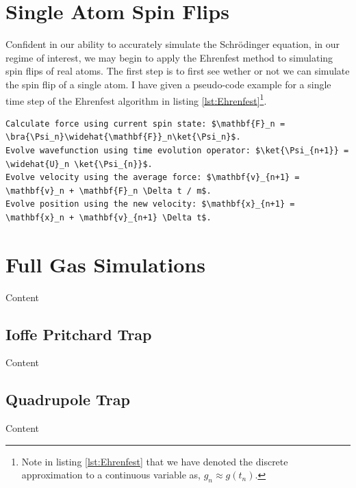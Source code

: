 
\section{Single Atom Spin Flips}

Confident in our ability to accurately simulate the Schr\"odinger equation, in our regime of interest, we may begin to apply the Ehrenfest method to simulating spin flips of real atoms.
The first step is to first see wether or not we can simulate the spin flip of a single atom.
I have given a pseudo-code example for a single time step of the Ehrenfest algorithm in listing \ref{lst:Ehrenfest}\footnote{Note in listing \ref{lst:Ehrenfest} that we have denoted the discrete approximation to a continuous variable as, $g_n \approx g(t_n)$.}.
\begin{lstlisting}[float,caption=Psuedo-code algorithm for a single Ehrenfest method time step, mathescape,label= lst:Ehrenfest,stepnumber=1]
Calculate force using current spin state: $\mathbf{F}_n = \bra{\Psi_n}\widehat{\mathbf{F}}_n\ket{\Psi_n}$.
Evolve wavefunction using time evolution operator: $\ket{\Psi_{n+1}} = \widehat{U}_n \ket{\Psi_{n}}$.
Evolve velocity using the average force: $\mathbf{v}_{n+1} = \mathbf{v}_n + \mathbf{F}_n \Delta t / m$.
Evolve position using the new velocity: $\mathbf{x}_{n+1} = \mathbf{x}_n + \mathbf{v}_{n+1} \Delta t$.
\end{lstlisting}


\section{Full Gas Simulations}

Content


\subsection{Ioffe Pritchard Trap}

Content


\subsection{Quadrupole Trap}

Content